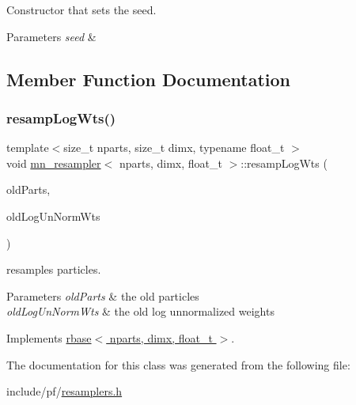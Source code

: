 Constructor that sets the seed. 


\begin{DoxyParams}{Parameters}
{\em seed} & \\
\hline
\end{DoxyParams}


\subsection{Member Function Documentation}
\mbox{\label{classmn__resampler_a13b1897e180a791a3a099d5d6329a125}} 
\subsubsection{\texorpdfstring{resamp\+Log\+Wts()}{resampLogWts()}}
{\footnotesize\ttfamily template$<$size\+\_\+t nparts, size\+\_\+t dimx, typename float\+\_\+t $>$ \\
void \hyperlink{classmn__resampler}{mn\+\_\+resampler}$<$ nparts, dimx, float\+\_\+t $>$\+::resamp\+Log\+Wts (\begin{DoxyParamCaption}\item[{\hyperlink{classrbase_aa12fc826befa6ba0647b5f59ebc396ee}{array\+Vec} \&}]{old\+Parts,  }\item[{\hyperlink{classrbase_a6f76bef853e508cb5b6f546d231b06f5}{array\+Float} \&}]{old\+Log\+Un\+Norm\+Wts }\end{DoxyParamCaption})\hspace{0.3cm}{\ttfamily [virtual]}}



resamples particles. 


\begin{DoxyParams}{Parameters}
{\em old\+Parts} & the old particles \\
\hline
{\em old\+Log\+Un\+Norm\+Wts} & the old log unnormalized weights \\
\hline
\end{DoxyParams}


Implements \hyperlink{classrbase_aff0f6f88fd4656e67f5ebc870f10dd44}{rbase$<$ nparts, dimx, float\+\_\+t $>$}.



The documentation for this class was generated from the following file\+:\begin{DoxyCompactItemize}
\item 
include/pf/\hyperlink{resamplers_8h}{resamplers.\+h}\end{DoxyCompactItemize}
